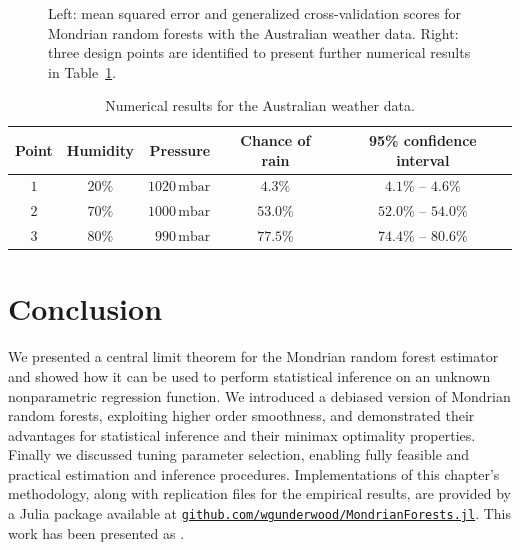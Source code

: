\begin{figure}[ht]
\begin{subfigure}{0.45\textwidth}
  \end{subfigure}
  \caption{Left: mean squared error and generalized cross-validation scores
    for Mondrian random forests with the Australian weather data.
    Right: three design points are identified to present further numerical
  results in Table~\ref{tab:weather_ci}.}
  \label{fig:weather_gcv}
\end{figure}

\begin{table}[ht]
  \begin{center}
    \begin{tabular}{|c|c|r|c|c|}
      \hline
      Point & Humidity & Pressure &
      Chance of rain & 95\% confidence interval \\
      \hline
      $1$ & $20\%$ & $1020\,\textrm{mbar}$ &
      $4.3\%$ &
      $4.1\%$ -- $4.6\%$ \\
      $2$ & $70\%$ & $1000\,\textrm{mbar}$ &
      $53.0\%$ &
      $52.0\%$ -- $54.0\%$ \\
      $3$ & $80\%$ & $990\,\textrm{mbar}$ &
      $77.5\%$ &
      $74.4\%$ -- $80.6\%$ \\
      \hline
    \end{tabular}
  \end{center}
  \caption{Numerical results for the Australian weather data.}
  \label{tab:weather_ci}
\end{table}

\section{Conclusion}%
\label{sec:mondrian_conclusion}

We presented a central limit theorem for the Mondrian random forest
estimator and showed how it can be used to perform statistical inference
on an unknown nonparametric regression function.
We introduced a debiased version of Mondrian random forests, exploiting higher
order smoothness, and
demonstrated their advantages for statistical inference and their
minimax optimality properties.
Finally we discussed tuning parameter selection, enabling fully
feasible and practical estimation and inference procedures.
Implementations of this chapter's methodology,
along with replication files for the empirical results,
are provided by a Julia package available at
\href{https://github.com/WGUNDERWOOD/MondrianForests.jl}%
{\texttt{github.com/wgunderwood/MondrianForests.jl}}.
This work has been presented as
%
\cite{%
  underwood2024talkmichigan,%
  underwood2024talkillinois,%
  underwood2024talkpitt%
}.
